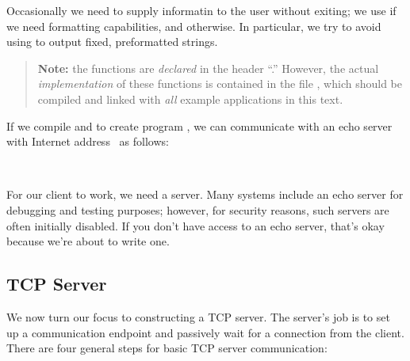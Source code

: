 Occasionally we need to supply informatin to the user without exiting;
we use  if we need formatting capabilities, and
 otherwise.  In particular, we try to avoid using
 to output fixed, preformatted strings.

\begin{quote}
\textbf{Note:} the 
functions are \emph{declared\/} in the header
``.'' However, the actual \emph{implementation\/}
of these functions is contained in the file ,
which should be compiled and linked with \emph{all} example
applications in this text. 
\end{quote}


If we compile  and  to
create program , we can communicate with
an echo server with Internet address \serverIPiv\ as follows:

\begin{shell}
\prompt {} \\
\end{shell}

For our client to work, we need a server.  Many
systems include an echo server for debugging and testing purposes; however, for
security reasons, such servers are often initially disabled.  If you don't have
access to an echo server, that's okay because we're about to write one.

\subsection{TCP Server}

\noindent We now turn our focus to constructing a TCP server.  The
server's job is to set up a communication endpoint and passively wait
for a connection from the client.
There are four general steps for basic TCP server communication:

